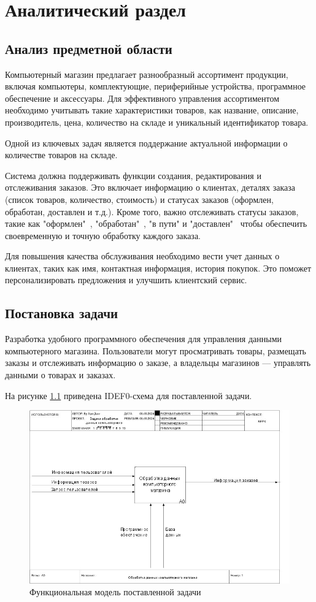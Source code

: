 \chapter{Аналитический раздел} 

\section{Анализ предметной области}
Компьютерный магазин предлагает разнообразный ассортимент продукции, включая компьютеры, комплектующие, периферийные устройства, программное обеспечение и аксессуары. Для эффективного управления ассортиментом необходимо учитывать такие характеристики товаров, как название, описание, производитель, цена, количество на складе и уникальный идентификатор товара. \cite{2}

Одной из ключевых задач является поддержание актуальной информации о количестве товаров на складе. 

Система должна поддерживать функции создания, редактирования и отслеживания заказов. Это включает информацию о клиентах, деталях заказа (список товаров, количество, стоимость) и статусах заказов (оформлен, обработан, доставлен и т.д.). Кроме того, важно отслеживать статусы заказов, такие как "оформлен"  \,, "обработан"  \,, "в пути" и "доставлен" \ чтобы обеспечить своевременную и точную обработку каждого заказа. \cite{3}

Для повышения качества обслуживания необходимо вести учет данных о клиентах, таких как имя, контактная информация, история покупок. Это поможет персонализировать предложения и улучшить клиентский сервис. \cite{3}
\newpage
\section{Постановка задачи}
Разработка удобного программного обеспечения для управления данными компьютерного магазина. Пользователи могут просматривать товары, размещать заказы и отслеживать информацию о заказе, а владельцы магазинов — управлять данными о товарах и заказах.

На рисунке \ref{img:idef0} приведена IDEF0-схема для поставленной задачи.
\begin{figure}[ht!]
	\centering
	\includegraphics[width=1\linewidth]{img/1.jpg}
	\caption{Функциональная модель поставленной задачи}
	\label{img:idef0}
\end{figure}

